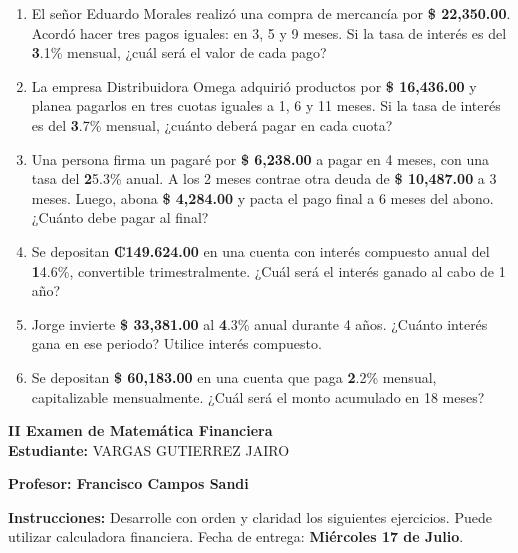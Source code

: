 \documentclass[14pt]{article}
\begin{document}
\begin{enumerate}
  \item El señor Eduardo Morales realizó una compra de mercancía por \textbf{\$ 22,350.00}. Acordó hacer tres pagos iguales: en 3, 5 y 9 meses. Si la tasa de interés es del \textbf3.1\% mensual, ¿cuál será el valor de cada pago?

  \item La empresa Distribuidora Omega adquirió productos por \textbf{\$ 16,436.00} y planea pagarlos en tres cuotas iguales a 1, 6 y 11 meses. Si la tasa de interés es del \textbf3.7\% mensual, ¿cuánto deberá pagar en cada cuota?

  \item Una persona firma un pagaré por \textbf{\$ 6,238.00} a pagar en 4 meses, con una tasa del \textbf25.3\% anual. A los 2 meses contrae otra deuda de \textbf{\$ 10,487.00} a 3 meses. Luego, abona \textbf{\$ 4,284.00} y pacta el pago final a 6 meses del abono. ¿Cuánto debe pagar al final?

  \item Se depositan \textbf{₡149.624.00} en una cuenta con interés compuesto anual del \textbf14.6\%, convertible trimestralmente. ¿Cuál será el interés ganado al cabo de 1 año?

  \item Jorge invierte \textbf{\$ 33,381.00} al \textbf4.3\% anual durante 4 años. ¿Cuánto interés gana en ese periodo? Utilice interés compuesto.

  \item Se depositan \textbf{\$ 60,183.00} en una cuenta que paga \textbf2.2\% mensual, capitalizable mensualmente. ¿Cuál será el monto acumulado en 18 meses?
\end{enumerate}
\newpage

\begin{center}
    {\LARGE \textbf{II Examen de Matemática Financiera}}\\[1em]
    {\large \textbf{Estudiante:} VARGAS GUTIERREZ JAIRO}
\end{center}

\vspace{1cm}

\textbf{Profesor: Francisco Campos Sandi}

\textbf{Instrucciones:} Desarrolle con orden y claridad los siguientes ejercicios. Puede utilizar calculadora financiera. Fecha de entrega: \textbf{Miércoles 17 de Julio}.
\end{document}
